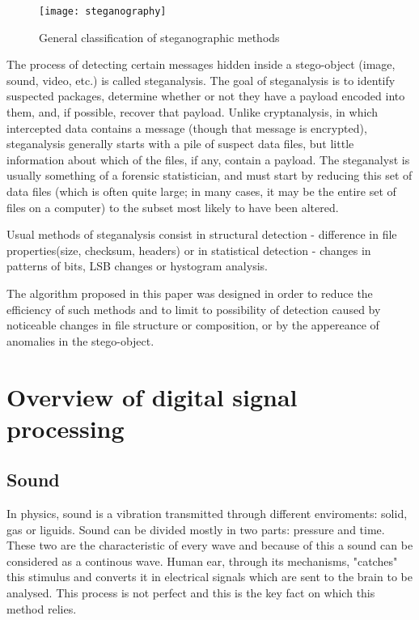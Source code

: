 \documentclass[12pt]{report}
\begin{document}
\begin{figure}[!h]
\centering
\texttt{[image: steganography]}
\caption{General classification of steganographic methods}
\label{fig:steganography}
\end{figure}

The process of detecting certain messages hidden inside a stego-object (image, sound, video, etc.) is called steganalysis. The goal of steganalysis is to identify suspected packages, determine whether or not they have a payload encoded into them, and, if possible, recover that payload. 
Unlike cryptanalysis, in which intercepted data contains a message (though that message is encrypted), steganalysis generally starts with a pile of suspect data files, but little information about which of the files, if any, contain a payload. The steganalyst is usually something of a forensic statistician, and must start by reducing this set of data files (which is often quite large; in many cases, it may be the entire set of files on a computer) to the subset most likely to have been altered.

Usual methods of steganalysis consist in structural detection - difference in file properties(size, checksum, headers) or in statistical detection - changes in patterns of bits, LSB changes or hystogram analysis.

The algorithm proposed in this paper was designed in order to reduce the efficiency of such methods and to limit to possibility of detection caused by noticeable changes in file structure or composition, or by the appereance of anomalies in the stego-object.

\section{Overview of digital signal processing}
\subsection{Sound}
In physics, sound is a vibration transmitted through different enviroments: solid, gas or liguids. Sound can be divided mostly in two parts: pressure and time. These two are the characteristic of every wave and because of this a sound can be considered as a continous wave. Human ear, through its mechanisms, "catches" this stimulus and converts it in electrical signals which are sent to the brain to be analysed. This process is not perfect and this is the key fact on which this method relies.
\end{document}
